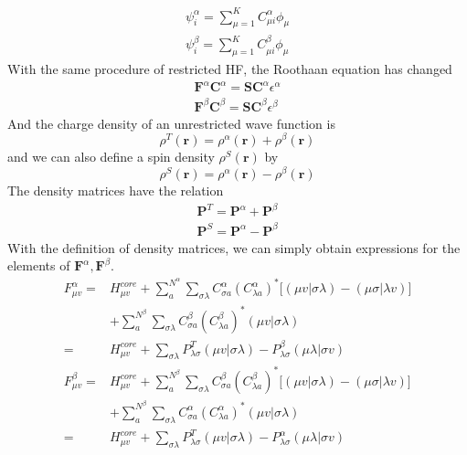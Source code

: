 \documentclass[11pt]{article}
\begin{document}
\begin{equation}
    \begin{split}
        \psi_i^\alpha=\sum_{\mu=1}^{K}C_{\mu i}^\alpha\phi_\mu\\
    \psi_i^\beta=\sum_{\mu=1}^{K}C_{\mu i}^\beta\phi_\mu    
    \end{split}
\end{equation}
With the same procedure of restricted HF, the Roothaan equation has changed
\begin{equation}
    \begin{split}
        \mathbf{F}^\alpha\mathbf{C}^\alpha=\mathbf{S}\mathbf{C}^\alpha\epsilon^\alpha\\
        \mathbf{F}^\beta\mathbf{C}^\beta=\mathbf{S}\mathbf{C}^\beta\epsilon^\beta
    \end{split}
\end{equation}
And the charge density of an unrestricted wave function is
\begin{equation}
    \rho^T(\mathbf{r})=\rho^\alpha(\mathbf{r})+\rho^\beta(\mathbf{r})
\end{equation}
and we can also define a spin density $\rho^S(\mathbf{r})$ by
\begin{equation}
    \rho^S(\mathbf{r})=\rho^\alpha(\mathbf{r})-\rho^\beta(\mathbf{r})
\end{equation}
The density matrices have the relation
\begin{align}
    \mathbf{P}^T=\mathbf{P}^\alpha+\mathbf{P}^\beta\\
    \mathbf{P}^S=\mathbf{P}^\alpha-\mathbf{P}^\beta
\end{align}
With the definition of density matrices, we can simply obtain expressions for the elements of $\mathbf{F}^\alpha, \mathbf{F}^\beta$.
\begin{equation}
    \begin{split}
        F_{\mu v}^\alpha=&H_{\mu v}^{core}+\sum_{a}^{N^\alpha}\sum_{\sigma\lambda}C^\alpha_{\sigma a}{(C^\alpha_{\lambda a})}^*\big[(\mu v|\sigma\lambda)-(\mu \sigma|\lambda v)\big]\\
        &+\sum_{a}^{N^\beta}\sum_{\sigma\lambda}C^\beta_{\sigma a}{(C^\beta_{\lambda a})}^*(\mu v|\sigma \lambda)\\
        =&H_{\mu v}^{core}+\sum_{\sigma\lambda}P^T_{\lambda\sigma}(\mu v|\sigma\lambda)-P^\beta_{\lambda \sigma}(\mu \lambda|\sigma v)\\
        F_{\mu v}^\beta=&H_{\mu v}^{core}+\sum_{a}^{N^\beta}\sum_{\sigma\lambda}C^\beta_{\sigma a}{(C^\beta_{\lambda a})}^*\big[(\mu v|\sigma\lambda)-(\mu \sigma|\lambda v)\big]\\
        &+\sum_{a}^{N^\beta}\sum_{\sigma\lambda}C^\alpha_{\sigma a}{(C^\alpha_{\lambda a})}^*(\mu v|\sigma \lambda)\\
        =&H_{\mu v}^{core}+\sum_{\sigma\lambda}P^T_{\lambda\sigma}(\mu v|\sigma\lambda)-P^\alpha_{\lambda \sigma}(\mu \lambda|\sigma v)\\
    \end{split}
\end{equation}
\end{document}
